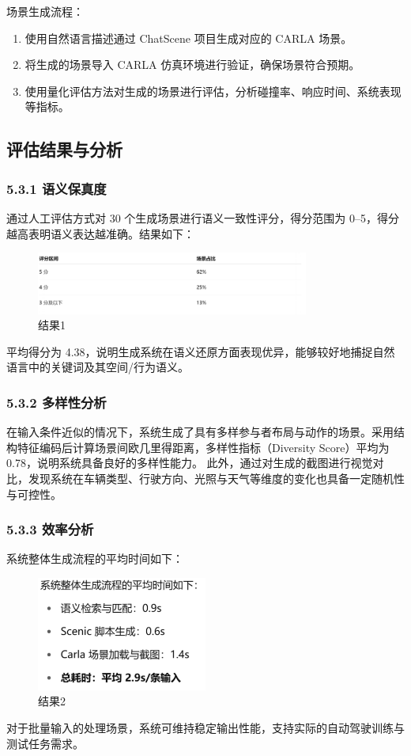 \documentclass{article}
\begin{document}
场景生成流程：
\begin{enumerate}
	\item 使用自然语言描述通过 ChatScene 项目生成对应的 CARLA 场景。
	\item 将生成的场景导入 CARLA 仿真环境进行验证，确保场景符合预期。
	\item 使用量化评估方法对生成的场景进行评估，分析碰撞率、响应时间、系统表现等指标。
\end{enumerate}

\subsection{评估结果与分析}
\subsubsection{5.3.1 语义保真度}
通过人工评估方式对 30 个生成场景进行语义一致性评分，得分范围为 0–5，得分越高表明语义表达越准确。结果如下：
\begin{figure}[h]
	\centering
	\includegraphics[width=0.8\textwidth]{"images/picture1.pdf"}
	\caption{结果1}
	\label{fig:example}
\end{figure}
平均得分为 4.38，说明生成系统在语义还原方面表现优异，能够较好地捕捉自然语言中的关键词及其空间/行为语义。

\subsubsection{5.3.2 多样性分析}
在输入条件近似的情况下，系统生成了具有多样参与者布局与动作的场景。采用结构特征编码后计算场景间欧几里得距离，多样性指标（Diversity Score）平均为 0.78，说明系统具备良好的多样性能力。
此外，通过对生成的截图进行视觉对比，发现系统在车辆类型、行驶方向、光照与天气等维度的变化也具备一定随机性与可控性。

\subsubsection{5.3.3 效率分析}
系统整体生成流程的平均时间如下：
\begin{figure}[h]
	\centering
	\includegraphics[width=0.5\textwidth]{"images/picture2.pdf"}
	\caption{结果2}
	\label{fig:example2}
\end{figure}
对于批量输入的处理场景，系统可维持稳定输出性能，支持实际的自动驾驶训练与测试任务需求。
\newpage
\end{document}
